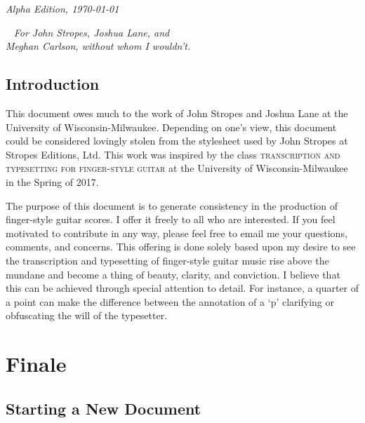 \documentclass[]{memoir}
\begin{document}
  \par\textit{Alpha Edition, \today}

  \clearpage

\tableofcontents



\listoftables

\clearpage
~\vfill
{\Huge \textit{For John Stropes, Joshua Lane, and}}\\

\vspace*{.15in}
{\Huge \textit{Meghan Carlson, without whom I wouldn't.}}
\vfill
\vfill

\clearpage

\chapter{Introduction}
This document owes much to the work of John Stropes and Joshua Lane at
the University of Wisconsin-Milwaukee. Depending on one's view, this
document could be considered lovingly stolen from the stylesheet used
by John Stropes at Stropes Editions, Ltd. This work was inspired by
the class \textsc{transcription and typesetting for finger-style
  guitar} at the University of Wisconsin-Milwaukee in the Spring of
2017.

The purpose of this document is to generate consistency in the
production of finger-style guitar scores. I offer it freely to all who
are interested. If you feel motivated to contribute in any way, please
feel free to email me your questions, comments, and concerns. This
offering is done solely based upon my desire to see the transcription
and typesetting of finger-style guitar music rise above the mundane
and become a thing of beauty, clarity, and conviction. I believe that
this can be achieved through special attention to detail. For
instance, a quarter of a point can make the difference between the
annotation of a `\textsf{p}' clarifying or obfuscating the will of the
typesetter.

\mainmatter

\part{Finale}
\chapter{Starting a New Document}
\label{cha:start-new-docum}
\end{document}
